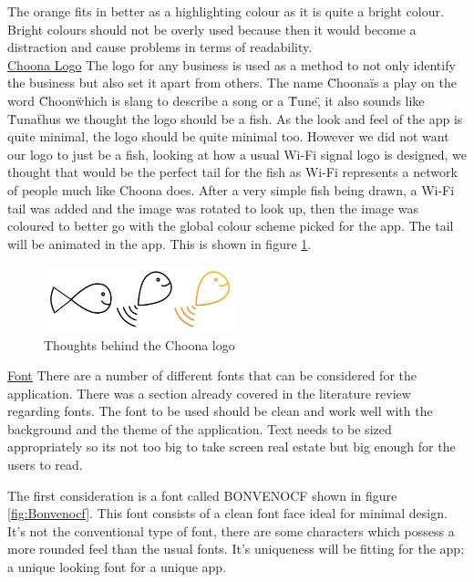 The orange fits in better as a highlighting colour as it is quite a bright colour. Bright colours should not be overly used because then it would become a distraction and cause problems in terms of readability.  \\

\noindent\underline{Choona Logo}\newline
The logo for any business is used as a method to not only identify the business but also set it apart from others. The name \"Choona\" is a play on the word \"Choon\" which is slang to describe a song or a \"Tune\", it also sounds like \"Tuna\" thus we thought the logo should be a fish. As the look and feel of the app is quite minimal, the logo should be quite minimal too. However we did not want our logo to just be a fish, looking at how a usual Wi-Fi signal logo is designed, we thought that would be the perfect tail for the fish as Wi-Fi represents a network of people much like Choona does. After a very simple fish being drawn, a Wi-Fi tail was added and the image was rotated to look up, then the image was coloured to better go with the global colour scheme picked for the app. The tail will be animated in the app. This is shown in figure \ref{fig:logo}.

\begin{figure}[h!]
\centering
\includegraphics[width=0.5\textwidth]{./img/logothinking.png}
\caption{Thoughts behind the Choona logo}
\label{fig:logo}
\end{figure}


\noindent\underline{Font}\newline
There are a number of different fonts that can be considered for the application. There was a section already covered in the literature review regarding fonts. The font to be used should be clean and work well with the background and the theme of the application. Text needs to be sized appropriately so its not too big to take screen real estate but big enough for the users to read.

The first consideration is a font called BONVENOCF shown in figure \ref{fig:Bonvenocf}. This font consists of a clean font face ideal for minimal design. It's not the conventional type of font, there are some characters which possess a more rounded feel than the usual fonts. It's uniqueness will be fitting for the app; a unique looking font for a unique app. 


